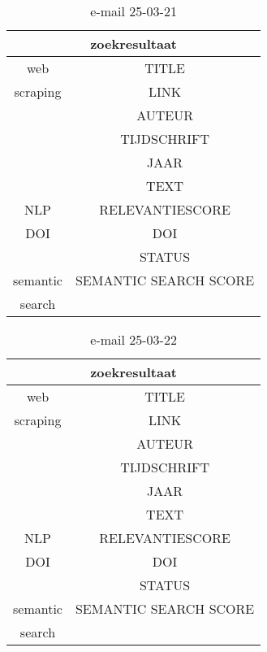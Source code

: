 \begin{table}[h!]
    \caption{e-mail 25-03-21}
    \centering
    \begin{tabular}{|c|c|} 
        \hline
        \multicolumn{2}{|c|}{\textbf{zoekresultaat}} \\
        \hline
        web &TITLE\\
        scraping&LINK\\
        &AUTEUR\\
        &TIJDSCHRIFT\\
        &JAAR\\
        &TEXT\\
        \hline
        NLP&RELEVANTIESCORE\\
        \hline
        DOI&DOI\\
        &STATUS\\
        \hline
        semantic&SEMANTIC SEARCH SCORE\\
        search&\\
        \hline
    \end{tabular}
    \label{table:email20250321}
\end{table}
\begin{table}[h!]
    \caption{e-mail 25-03-22}
    \centering
    \begin{tabular}{|c|c|} 
        \hline
        \multicolumn{2}{|c|}{\textbf{zoekresultaat}} \\
        \hline
        web &TITLE\\
        scraping&LINK\\
        &AUTEUR\\
        &TIJDSCHRIFT\\
        &JAAR\\
        &TEXT\\
        \hline
        NLP&RELEVANTIESCORE\\
        \hline
        DOI&DOI\\
        &STATUS\\
        \hline
        semantic&SEMANTIC SEARCH SCORE\\
        search&\\
        \hline
    \end{tabular}
    \label{table:email20250322}
\end{table}
